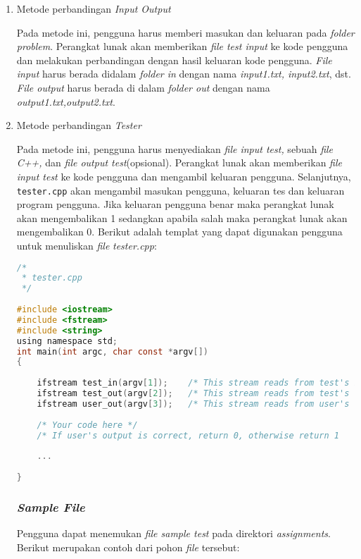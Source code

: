 \begin{enumerate}
\item Metode perbandingan \textit{Input Output}

Pada metode ini, pengguna harus memberi masukan dan keluaran pada \textit{folder problem}. Perangkat lunak akan memberikan \textit{file test input} ke kode pengguna dan melakukan perbandingan dengan hasil keluaran kode pengguna. \textit{File input} harus berada didalam \textit{folder in} dengan nama \textit{input1.txt, input2.txt}, dst. \textit{File output} harus berada di dalam \textit{folder out} dengan nama \textit{output1.txt,output2.txt}.

\item Metode perbandingan \textit{Tester}

Pada metode ini, pengguna harus menyediakan \textit{file input test,} sebuah \textit{file C++,} dan \textit{file output test}(opsional). Perangkat lunak akan memberikan \textit{file input test} ke kode pengguna dan mengambil keluaran pengguna. Selanjutnya, \verb|tester.cpp| akan mengambil masukan pengguna, keluaran tes dan keluaran program pengguna. Jika keluaran pengguna benar maka perangkat lunak akan mengembalikan 1 sedangkan apabila salah maka perangkat lunak akan mengembalikan 0. Berikut adalah templat yang dapat digunakan pengguna untuk menuliskan \textit{file} \textit{tester.cpp}:

\begin{lstlisting}[language=C,caption=Templat kode \textit{tester.cpp}, label=kode:cpptemplate]
/*
 * tester.cpp
 */
 
#include <iostream>
#include <fstream>
#include <string>
using namespace std;
int main(int argc, char const *argv[])
{
 
	ifstream test_in(argv[1]);    /* This stream reads from test's input file   */
	ifstream test_out(argv[2]);   /* This stream reads from test's output file  */
	ifstream user_out(argv[3]);   /* This stream reads from user's output file  */
 
	/* Your code here */
	/* If user's output is correct, return 0, otherwise return 1       */
 
	...
 
}
\end{lstlisting}

\subsubsection{\textit{Sample File}}
Pengguna dapat menemukan \textit{file sample test} pada direktori \textit{assignments}. Berikut merupakan contoh dari pohon \textit{file} tersebut:


\end{enumerate}
